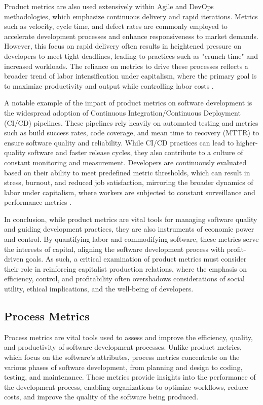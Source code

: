 \begin{refsection}
Product metrics are also used extensively within Agile and DevOps methodologies, which emphasize continuous delivery and rapid iterations. Metrics such as velocity, cycle time, and defect rates are commonly employed to accelerate development processes and enhance responsiveness to market demands. However, this focus on rapid delivery often results in heightened pressure on developers to meet tight deadlines, leading to practices such as "crunch time" and increased workloads. The reliance on metrics to drive these processes reflects a broader trend of labor intensification under capitalism, where the primary goal is to maximize productivity and output while controlling labor costs \cite[pp.~143-145]{Sutherland2021Scrum}.

A notable example of the impact of product metrics on software development is the widespread adoption of Continuous Integration/Continuous Deployment (CI/CD) pipelines. These pipelines rely heavily on automated testing and metrics such as build success rates, code coverage, and mean time to recovery (MTTR) to ensure software quality and reliability. While CI/CD practices can lead to higher-quality software and faster release cycles, they also contribute to a culture of constant monitoring and measurement. Developers are continuously evaluated based on their ability to meet predefined metric thresholds, which can result in stress, burnout, and reduced job satisfaction, mirroring the broader dynamics of labor under capitalism, where workers are subjected to constant surveillance and performance metrics \cite[pp.~78-81]{Edwards1980ContestedTerrain}.

In conclusion, while product metrics are vital tools for managing software quality and guiding development practices, they are also instruments of economic power and control. By quantifying labor and commodifying software, these metrics serve the interests of capital, aligning the software development process with profit-driven goals. As such, a critical examination of product metrics must consider their role in reinforcing capitalist production relations, where the emphasis on efficiency, control, and profitability often overshadows considerations of social utility, ethical implications, and the well-being of developers.

\subsection{Process Metrics}

Process metrics are vital tools used to assess and improve the efficiency, quality, and productivity of software development processes. Unlike product metrics, which focus on the software's attributes, process metrics concentrate on the various phases of software development, from planning and design to coding, testing, and maintenance. These metrics provide insights into the performance of the development process, enabling organizations to optimize workflows, reduce costs, and improve the quality of the software being produced.


\end{refsection}
